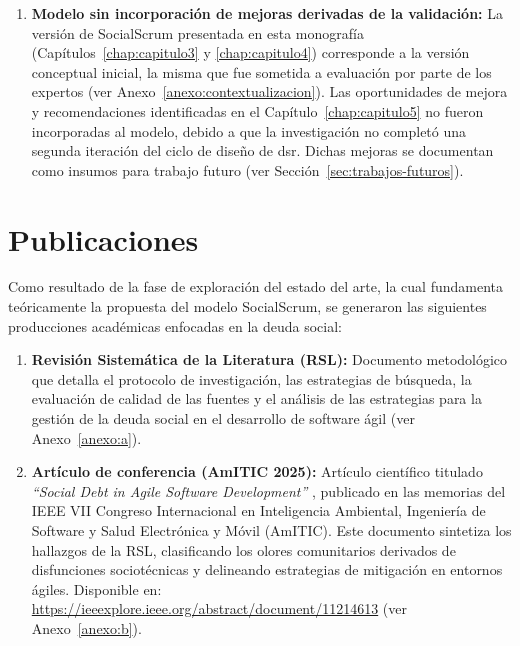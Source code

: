 \begin{enumerate}
    \item \textbf{Modelo sin incorporación de mejoras derivadas de la validación:} La versión de SocialScrum presentada en esta monografía (Capítulos~\ref{chap:capitulo3} y \ref{chap:capitulo4}) corresponde a la versión conceptual inicial, la misma que fue sometida a evaluación por parte de los expertos (ver Anexo~\ref{anexo:contextualizacion}). Las oportunidades de mejora y recomendaciones identificadas en el Capítulo~\ref{chap:capitulo5} no fueron incorporadas al modelo, debido a que la investigación no completó una segunda iteración del ciclo de diseño de \gls{dsr}. Dichas mejoras se documentan como insumos para trabajo futuro (ver Sección~\ref{sec:trabajos-futuros}).
\end{enumerate}

\section{Publicaciones}
\label{sec:publicaciones}

Como resultado de la fase de exploración del estado del arte, la cual fundamenta teóricamente la propuesta del modelo SocialScrum, se generaron las siguientes producciones académicas enfocadas en la deuda social:

\begin{enumerate}
    \item \textbf{Revisión Sistemática de la Literatura (RSL):} Documento metodológico que detalla el protocolo de investigación, las estrategias de búsqueda, la evaluación de calidad de las fuentes y el análisis de las estrategias para la gestión de la deuda social en el desarrollo de software ágil (ver Anexo~\ref{anexo:a}).

    \item \textbf{Artículo de conferencia (AmITIC 2025):} Artículo científico titulado \textit{``Social Debt in Agile Software Development''} \cite{romero2025social}, publicado en las memorias del IEEE VII Congreso Internacional en Inteligencia Ambiental, Ingeniería de Software y Salud Electrónica y Móvil (AmITIC). Este documento sintetiza los hallazgos de la RSL, clasificando los olores comunitarios derivados de disfunciones sociotécnicas y delineando estrategias de mitigación en entornos ágiles. Disponible en: \url{https://ieeexplore.ieee.org/abstract/document/11214613} (ver Anexo~\ref{anexo:b}).
\end{enumerate}

